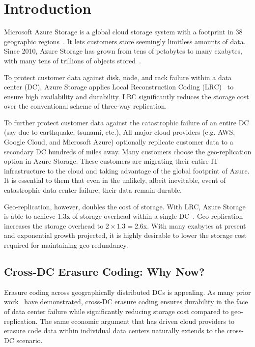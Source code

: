\section{Introduction}

Microsoft Azure Storage is a global cloud storage system with a footprint in 38 geographic regions~\cite{bib:azureregions}. It lets customers store seemingly limitless amounts of data. Since 2010, Azure Storage has grown from tens of petabytes to many exabytes, with many tens of trillions of objects stored~\cite{greenberg2015sdn}.


To protect customer data against disk, node, and rack failure within a data center (DC), Azure Storage applies Local Reconstruction Coding (LRC)~\cite{huang2012erasure} to ensure high availability and durability. LRC significantly reduces the storage cost over the conventional scheme of three-way replication. %


To further protect customer data against the catastrophic failure of an entire DC (say due to earthquake, tsunami, etc.), All major cloud providers (e.g. AWS, Google Cloud, and Microsoft Azure) optionally replicate customer data to a secondary DC hundreds of miles away. Many customers choose the geo-replication option in Azure Storage. These customers are migrating their entire IT infrastructure to the cloud and taking advantage of the global footprint of Azure. It is essential to them that even in the unlikely, albeit inevitable, event of catastrophic data center failure, their data remain durable.

Geo-replication, however, doubles the cost of storage. With LRC, Azure Storage is able to achieve $1.3$x of storage overhead within a single DC~\cite{huang2012erasure}. Geo-replication increases the storage overhead to $2 \times 1.3 = 2.6$x. With many exabytes at present and exponential growth projected, it is highly desirable to lower the storage cost required for maintaining geo-redundancy.

\subsection{Cross-DC Erasure Coding: Why Now?}

Erasure coding across geographically distributed DCs is appealing. As many prior work~\cite{oceanstore:asplos00, pond:fast03, weatherspoon2005long, hail:ccs09, racs:socc10, hu12nccloud} have demonstrated, cross-DC erasure coding ensures durability in the face of data center failure while significantly reducing storage cost compared to geo-replication. The same economic argument that has driven cloud providers to erasure code data within individual data centers naturally extends to the cross-DC scenario.


